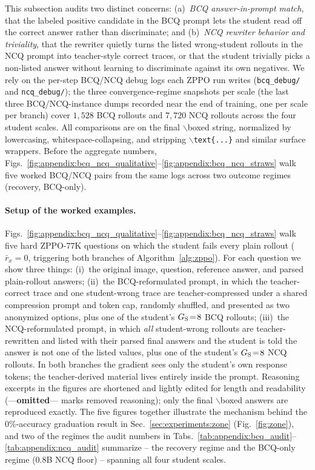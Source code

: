 This subsection audits two distinct concerns: (a)~\emph{BCQ answer-in-prompt match}, that the labeled positive candidate in the BCQ prompt lets the student read off the correct answer rather than discriminate; and (b)~\emph{NCQ rewriter behavior and triviality}, that the rewriter quietly turns the listed wrong-student rollouts in the NCQ prompt into teacher-style correct traces, or that the student trivially picks a non-listed answer without learning to discriminate against its own negatives. We rely on the per-step BCQ/NCQ debug logs each ZPPO run writes (\texttt{bcq\_debug/} and \texttt{ncq\_debug/}); the three convergence-regime snapshots per scale (the last three BCQ/NCQ-instance dumps recorded near the end of training, one per scale per branch) cover $1{,}528$ BCQ rollouts and $7{,}720$ NCQ rollouts across the four student scales. All comparisons are on the final $\backslash$boxed string, normalized by lowercasing, whitespace-collapsing, and stripping $\backslash$\texttt{text\{...\}} and similar surface wrappers. Before the aggregate numbers, Figs.~\ref{fig:appendix:bcq_ncq_qualitative}--\ref{fig:appendix:bcq_ncq_straws} walk five worked BCQ/NCQ pairs from the same logs across two outcome regimes (recovery, BCQ-only).

\paragraph{Setup of the worked examples.}
Figs.~\ref{fig:appendix:bcq_ncq_qualitative}--\ref{fig:appendix:bcq_ncq_straws} walk five hard ZPPO-$77$K questions on which the student fails every plain rollout ($\bar{r}_x\!=\!0$, triggering both branches of Algorithm~\ref{alg:zppo}). For each question we show three things: (i)~the original image, question, reference answer, and parsed plain-rollout answers; (ii)~the BCQ-reformulated prompt, in which the teacher-correct trace and one student-wrong trace are teacher-compressed under a shared compression prompt and token cap, randomly shuffled, and presented as two anonymized options, plus one of the student's $G_{\rm S}\!=\!8$ BCQ rollouts; (iii)~the NCQ-reformulated prompt, in which \emph{all} student-wrong rollouts are teacher-rewritten and listed with their parsed final answers and the student is told the answer is not one of the listed values, plus one of the student's $G_{\rm S}\!=\!8$ NCQ rollouts. In both branches the gradient sees only the student's own response tokens; the teacher-derived material lives entirely inside the prompt. Reasoning excerpts in the figures are shortened and lightly edited for length and readability (---\textbf{omitted}--- marks removed reasoning); only the final $\backslash$boxed answers are reproduced exactly. The five figures together illustrate the mechanism behind the $0\%$-accuracy graduation result in Sec.~\ref{sec:experiments:zone} (Fig.~\ref{fig:zone}), and two of the regimes the audit numbers in Tabs.~\ref{tab:appendix:bcq_audit}--\ref{tab:appendix:ncq_audit} summarize -- the recovery regime and the BCQ-only regime ($0.8$B NCQ floor) -- spanning all four student scales.

